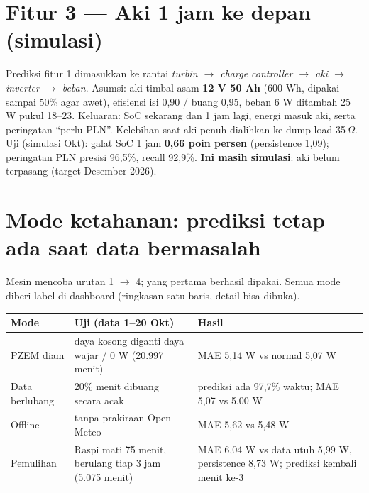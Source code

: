 \documentclass[10.5pt,a4paper]{article}
\begin{document}
\section{Fitur 3 --- Aki 1 jam ke depan (simulasi)}
Prediksi fitur 1 dimasukkan ke rantai \emph{turbin $\to$ charge controller $\to$ aki $\to$ inverter $\to$ beban}. Asumsi: aki timbal-asam
\textbf{12 V 50 Ah} (600 Wh, dipakai sampai 50\% agar awet), efisiensi isi 0,90 / buang 0,95, beban 6 W ditambah 25 W pukul 18--23. Keluaran:
SoC sekarang dan 1 jam lagi, energi masuk aki, serta peringatan ``perlu PLN''. Kelebihan saat aki penuh dialihkan ke dump load 35\,$\Omega$.
Uji (simulasi Okt): galat SoC 1 jam \textbf{0,66 poin persen} (persistence 1,09); peringatan PLN presisi 96,5\%, recall 92,9\%.
\textbf{Ini masih simulasi}: aki belum terpasang (target Desember 2026).

\section{Mode ketahanan: prediksi tetap ada saat data bermasalah}\label{sec:mode}
\begin{center}
\end{center}
Mesin mencoba urutan 1 $\to$ 4; yang pertama berhasil dipakai. Semua mode diberi label di dashboard (ringkasan satu baris, detail bisa dibuka).

\begin{tabularx}{\linewidth}{@{}>{\raggedright}p{2.3cm} >{\raggedright}X >{\raggedright\arraybackslash}p{6.2cm}@{}}
\toprule
Mode & Uji (data 1--20 Okt) & Hasil \\
\midrule
PZEM diam & daya kosong diganti daya wajar / 0 W (20.997 menit) & MAE 5,14 W vs normal 5,07 W \\
Data berlubang & 20\% menit dibuang secara acak & prediksi ada 97,7\% waktu; MAE 5,07 vs 5,00 W \\
Offline & tanpa prakiraan Open-Meteo & MAE 5,62 vs 5,48 W \\
Pemulihan & Raspi mati 75 menit, berulang tiap 3 jam (5.075 menit) & MAE 6,04 W vs data utuh 5,99 W, persistence 8,73 W; prediksi kembali menit ke-3 \\
\bottomrule
\end{tabularx}
\end{document}
